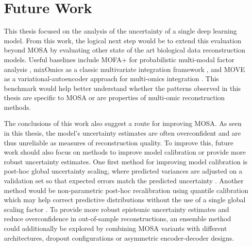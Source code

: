 \section{Future Work}

This thesis focused on the analysis of the uncertainty of a single deep learning model. From this work, the logical next step would be to extend this evaluation beyond MOSA by evaluating other state of the art biological data reconstruction models. Useful baselines include MOFA+ for probabilistic multi-modal factor analysis \cite{Argelaguet2020MOFAplus}, mixOmics as a classic multivariate integration framework \cite{Rohart2017mixOmics}, and MOVE as a variational-autoencoder approach for multi-omics integration \cite{Allesoe2023MOVE}.
This benchmark would help better understand whether the patterns observed in this thesis are specific to MOSA or are properties of multi-omic reconstruction methods.

The conclusions of this work also suggest a route for improving MOSA. As seen in this thesis, the model's uncertainty estimates are often overconfident and are thus unreliable as measures of reconstruction quality. To improve this, future work should also focus on methods to improve model calibration or provide more robust uncertainty estimates. One first method for improving model calibration is post-hoc global uncertainty scaling, where predicted variances are adjusted on a validation set so that expected errors match the predicted uncertainty \cite{Levi2022RegressionCalibration}. Another method would be non-parametric post-hoc recalibration using quantile calibration which may help correct predictive distributions without the use of a single global scaling factor \cite{Kuleshov2018}. To provide more robust epistemic uncertainty estimates and reduce overconfidence in out-of-sample reconstructions, an ensemble method could additionally be explored by combining MOSA variants with different architectures, dropout configurations or asymmetric encoder-decoder designs.